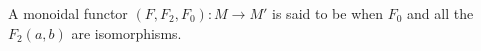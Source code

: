 A monoidal functor $(F, F_2, F_0) : M \to M'$ is said to be  when $F_0$ and all the $F_2(a, b)$ are isomorphisms.
